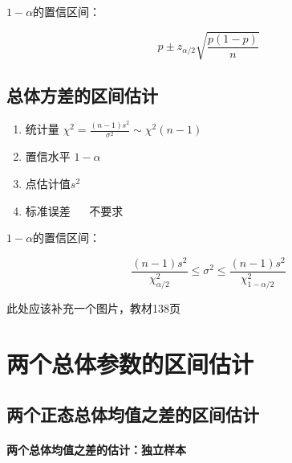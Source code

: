 \documentclass[UTF8,10pt]{book}
\begin{document}
                    $1-\alpha$的置信区间：

                        $$ p \pm z_{\alpha / 2} \sqrt{\frac{p(1-p)}{n}} $$

            \subsection{总体方差的区间估计}
                    {\kaishu

                    \begin{enumerate}
                        \item 统计量 $ \chi^2 = \frac{(n-1)s^2}{\sigma^2} \sim \chi^2(n-1)$
                        \item 置信水平 $1-\alpha$
                        \item 点估计值$s^2$
                        \item 标准误差 $ \quad $ 不要求
                    \end{enumerate}                                  
                    }

                    $1-\alpha$的置信区间：

                       $$ \frac{(n-1) s^2}{\chi^2_{\alpha/2}} \leq  \sigma^2  \leq  \frac{(n-1) s^2}{\chi^2_{1-\alpha/2}}$$

                此处应该补充一个图片，教材138页

        \section{两个总体参数的区间估计}

            \subsection{两个正态总体均值之差的区间估计}

                \paragraph{两个总体均值之差的估计：独立样本}
\end{document}

